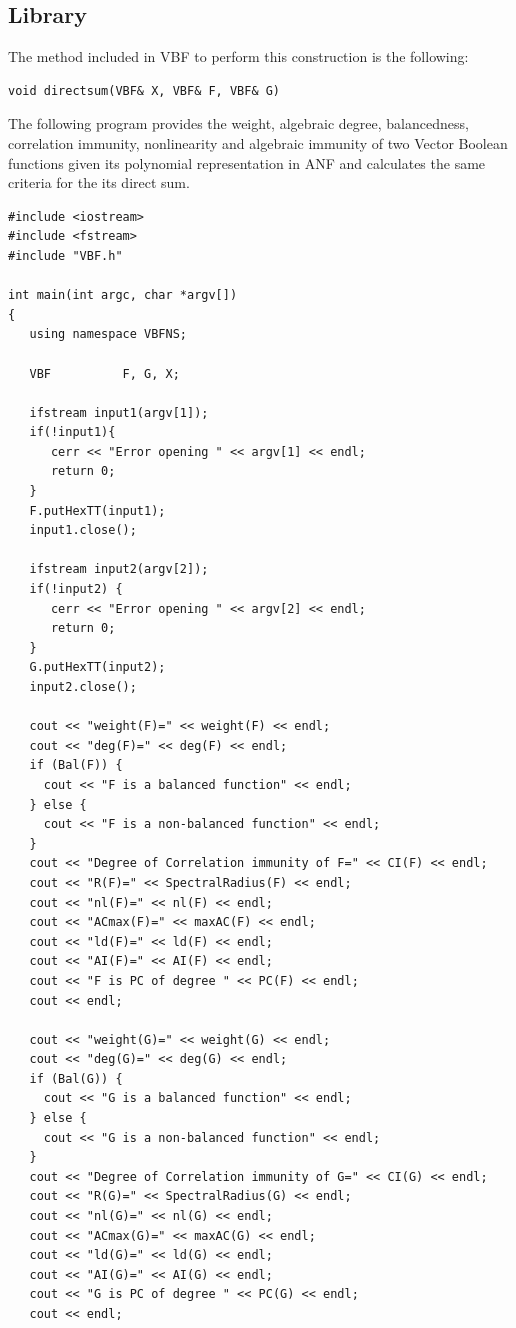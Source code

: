 \subsection{Library}

The method included in VBF to perform this construction is the following:

\begin{verbatim}
void directsum(VBF& X, VBF& F, VBF& G)  
\end{verbatim}

\begin{example}
The following program provides the weight, algebraic degree, balancedness, correlation immunity, nonlinearity and algebraic immunity of two Vector Boolean functions given its polynomial representation in ANF and calculates the same criteria for the its direct sum.

\begin{verbatim}
#include <iostream>
#include <fstream>
#include "VBF.h"

int main(int argc, char *argv[])
{
   using namespace VBFNS;

   VBF          F, G, X;

   ifstream input1(argv[1]);
   if(!input1){
      cerr << "Error opening " << argv[1] << endl;
      return 0;
   }
   F.putHexTT(input1);
   input1.close();

   ifstream input2(argv[2]);
   if(!input2) {
      cerr << "Error opening " << argv[2] << endl;
      return 0;
   }
   G.putHexTT(input2);
   input2.close();

   cout << "weight(F)=" << weight(F) << endl;
   cout << "deg(F)=" << deg(F) << endl;
   if (Bal(F)) {
     cout << "F is a balanced function" << endl;
   } else {
     cout << "F is a non-balanced function" << endl;
   }
   cout << "Degree of Correlation immunity of F=" << CI(F) << endl;
   cout << "R(F)=" << SpectralRadius(F) << endl;
   cout << "nl(F)=" << nl(F) << endl;
   cout << "ACmax(F)=" << maxAC(F) << endl;
   cout << "ld(F)=" << ld(F) << endl;
   cout << "AI(F)=" << AI(F) << endl;
   cout << "F is PC of degree " << PC(F) << endl;
   cout << endl;

   cout << "weight(G)=" << weight(G) << endl;
   cout << "deg(G)=" << deg(G) << endl;
   if (Bal(G)) {
     cout << "G is a balanced function" << endl;
   } else {
     cout << "G is a non-balanced function" << endl;
   }
   cout << "Degree of Correlation immunity of G=" << CI(G) << endl;
   cout << "R(G)=" << SpectralRadius(G) << endl;
   cout << "nl(G)=" << nl(G) << endl;
   cout << "ACmax(G)=" << maxAC(G) << endl;
   cout << "ld(G)=" << ld(G) << endl;
   cout << "AI(G)=" << AI(G) << endl;
   cout << "G is PC of degree " << PC(G) << endl;
   cout << endl;


\end{verbatim}
\end{example}
